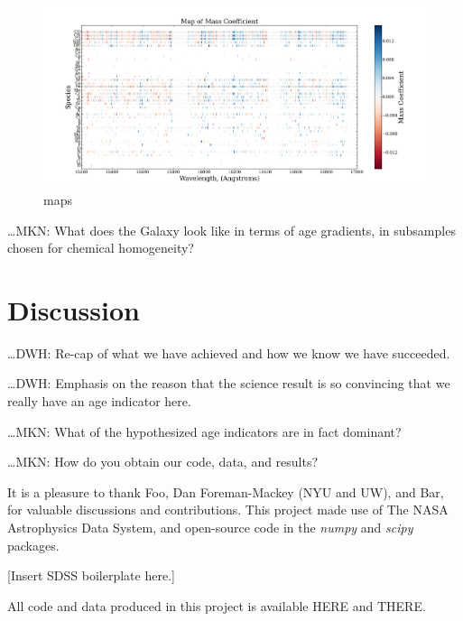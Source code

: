 \documentclass[12pt, preprint]{aastex}
\newcommand{\project}[1]{\textsl{#1}}
\begin{document}
\begin{figure}[h!]
  \includegraphics[scale=0.31]{./plots/mass_coefficient.png}
  \caption{maps} 
\label{fig:maps}
\end{figure}

\ldots MKN: What does the Galaxy look like in terms of age gradients,
in subsamples chosen for chemical homogeneity?

\section{Discussion}

\ldots DWH: Re-cap of what we have achieved and how we know we have
succeeded.

\ldots DWH: Emphasis on the reason that the science result is so
convincing that we really have an age indicator here.

\ldots MKN: What of the hypothesized age indicators are in fact
dominant?

\ldots MKN: How do you obtain our code, data, and results?

\acknowledgments
It is a pleasure to thank
  Foo,
  Dan Foreman-Mackey (NYU and UW), and
  Bar,
for valuable discussions and contributions.
This project made use of
  The NASA Astrophysics Data System,
  and open-source code in the \project{numpy} and \project{scipy} packages.

[Insert SDSS boilerplate here.]

All code and data produced in this project is available HERE and THERE.
\end{document}

